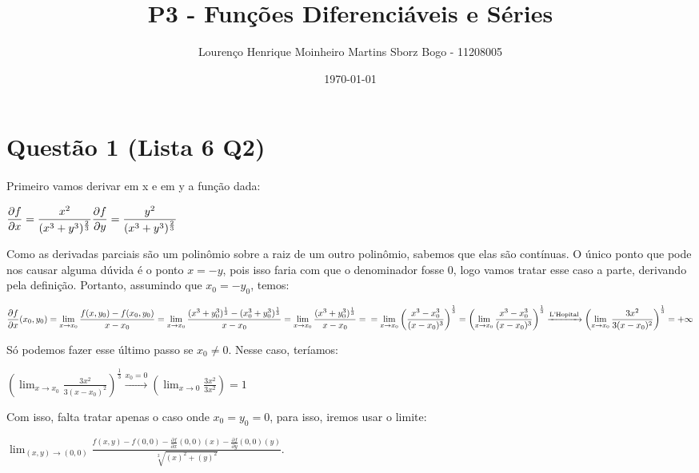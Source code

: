 \documentclass[11pt]{article}
\author{Lourenço Henrique Moinheiro Martins Sborz Bogo - 11208005}
\date{\today}
\title{P3 - Funções Diferenciáveis e Séries}
\begin{document}
\maketitle
\tableofcontents

\newpage

\section{Questão 1 (Lista 6 Q2)}
\label{sec:orgf8a6e15}
\paragraph{}Primeiro vamos derivar em x e em y a função dada:

\(\displaystyle\\
  \frac{\partial{f}}{\partial{x}} = \frac{x^2}{(x^3+y^3)^{\frac{2}{3}}}\\
  \frac{\partial{f}}{\partial{y}} = \frac{y^2}{(x^3+y^3)^{\frac{2}{3}}}\)


Como as derivadas parciais são um polinômio sobre a
raiz de um outro polinômio, sabemos que elas são contínuas.
O único ponto que pode nos causar alguma dúvida é
o ponto \(x = -y\), pois isso faria com que o denominador
fosse 0, logo vamos tratar esse caso a parte, derivando
pela definição. Portanto, assumindo que \(x_0 = -y_0\), temos: 

\(\displaystyle
  \frac{\partial{f}}{\partial{x}}(x_0, y_0) = 
  \lim_{x \to x_0}{\frac{f(x, y_0)-f(x_0, y_0)}{x-x_0}} =
  \lim_{x \to x_0}{\frac{(x^3+y_0^3)^{\frac{1}{3}}-(x_0^3+y_0^3)^{\frac{1}{3}}}{x-x_0}} = 
  \lim_{x \to x_0}{\frac{(x^3+y_0^3)^{\frac{1}{3}}}{x-x_0}} = \\
  = \lim_{x \to x_0}{\left(\frac{x^3-x_0^3}{(x-x_0)^3}\right)^{\frac{1}{3}}} = 
  \left(\lim_{x \to x_0}{\frac{x^3-x_0^3}{(x-x_0)^3}}\right)^{\frac{1}{3}} \xrightarrow{\text{L'Hopital}}
  \left(\lim_{x \to x_0}{\frac{3x^2}{3(x-x_0)^2}}\right)^{\frac{1}{3}} = +\infty\)

Só podemos fazer esse último passo se \(x_0 \neq 0\).
Nesse caso, teríamos:

\(\displaystyle\left(\lim_{x \to x_0}{\frac{3x^2}{3(x-x_0)^2}}\right)^{\frac{1}{3}} \xrightarrow{x_0 = 0} 
  \left(\lim_{x \to 0}{\frac{3x^2}{3x^2}}\right) = 1\)

Com isso, falta tratar apenas o caso onde \(x_0 = y_0 = 0\),
para isso, iremos usar o limite:

\(\displaystyle\lim_{(x, y) \to (0, 0)}{\frac{f(x, y)-f(0, 0)-\frac{\partial{f}}{\partial{x}}(0, 0)(x)-\frac{\partial{f}}{\partial{y}}(0, 0)(y)}{\sqrt[2]{(x)^2+(y)^2}}}\).
\end{document}
